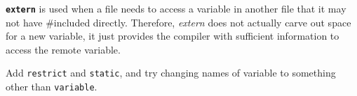 \textbf{\texttt{extern}} is used when a file needs to access a variable in
another file that it may not have \#included directly. Therefore, \emph{extern}
does not actually carve out space for a new variable, it just provides the
compiler with sufficient information to access the remote variable.

Add \texttt{restrict} and \texttt{static}, and try changing names of variable
to something other than \texttt{variable}.
